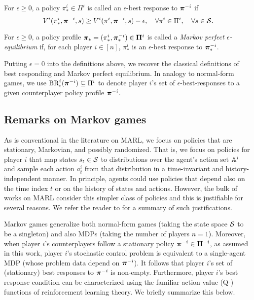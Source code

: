 \begin{definition}
    For $\epsilon \geq 0$, a policy $\pi^i_{*} \in \Pi^i$ is called an $\epsilon$-best response to $\bpi^{-i}$ if
        \[
        V^i ( \pi^i_{*}, \bpi^{-i} , s ) \geq V^i ( \pi^i, \bpi^{-i}, s ) - \epsilon  , \quad \forall  \pi^i \in \Pi^i, \quad \forall s \in \SS . 
        \]
\end{definition}


\begin{definition}
    For $\epsilon \geq 0$, a policy profile $\bpi_{*} = ( \pi^i_{*}, \bpi^{-i}_{*} ) \in \bPi^i$ is called a \emph{Markov perfect $\epsilon$-equilibrium} if, for each player $i \in [n]$, $\pi^i_{*}$ is an $\epsilon$-best response to $\bpi^{-i}_{*}$. 
\end{definition}

Putting $\epsilon = 0$ into the definitions above, we recover the classical definitions of best responding and Markov perfect equilibrium. In analogy to normal-form games, we use $\BR^i_{\epsilon} ( \bpi^{-i} ) \subseteq \Pi^i$ to denote player $i$'s set of $\epsilon$-best-responses to a given counterplayer policy profile $\bpi^{-i}$. 


\subsection*{Remarks on Markov games}

As is conventional in the literature on MARL, we focus on policies that are stationary, Markovian, and possibly randomized. That is, we focus on policies for player $i$ that map states $s_t \in \SS$ to distributions over the agent's action set $\aa^i$  and sample each action $a^i_t$ from that distribution in a time-invariant and history-independent manner. In principle, agents could use policies that depend also on the time index $t$ or on the history of states and actions. However, the bulk of works on MARL consider this simpler class of policies and this is justifiable for several reasons. We refer the reader to \cite{levy2013discounted} for a summary of such justifications. 

Markov games generalize both normal-form games (taking the state space $\SS$ to be a singleton) and also MDPs (taking the number of players $n=1$). Moreover, when player $i$'s counterplayers follow a stationary policy $\bpi^{-i} \in \bPi^{-i}$, as assumed in this work, player $i$'s stochastic control problem is equivalent to a single-agent MDP (whose problem data depend on $\bpi^{-i}$). It follows that player $i$'s set of (stationary) best responses to $\bpi^{-i}$ is non-empty. Furthermore, player $i$'s best response condition can be characterized using the familiar action value (Q-) functions of reinforcement learning theory. We briefly summarize this below.

